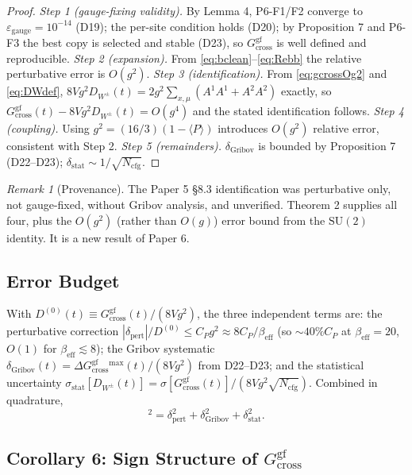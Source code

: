 \documentclass[11pt,a4paper]{article}
\theoremstyle{plain}
\theoremstyle{definition}
\theoremstyle{remark}
\newtheorem*{remark}{Remark}
\newcommand{\SU}{\mathrm{SU}}
\newcommand{\Gcrossgf}{G_{\mathrm{cross}}^{\mathrm{gf}}}
\newcommand{\DW}{D_{W^{\pm}}}
\newcommand{\be}{\beta_{\mathrm{eff}}}
\newcommand{\epsg}{\varepsilon_{\mathrm{gauge}}}
\newcommand{\Ncfg}{N_{\mathrm{cfg}}}
\begin{document}
\begin{proof}
\textit{Step 1 (gauge-fixing validity).} By Lemma 4, P6-F1/F2 converge to
$\epsg=10^{-14}$ (D19); the per-site condition holds (D20); by
Proposition 7 and P6-F3 the best copy is selected and stable (D23), so
$\Gcrossgf$ is well defined and reproducible.
\textit{Step 2 (expansion).} From \eqref{eq:bclean}--\eqref{eq:Rebb} the
relative perturbative error is $O(g^2)$.
\textit{Step 3 (identification).} From \eqref{eq:gcrossOg2} and
\eqref{eq:DWdef}, $8Vg^2\DW(t)=2g^2\sum_{x,\mu}(A^1A^1+A^2A^2)$ exactly,
so $\Gcrossgf(t)-8Vg^2\DW(t)=O(g^4)$ and the stated identification
follows.
\textit{Step 4 (coupling).} Using $g^2=(16/3)(1-\langle P\rangle)$ introduces
$O(g^2)$ relative error, consistent with Step 2.
\textit{Step 5 (remainders).} $\delta_{\mathrm{Gribov}}$ is bounded by
Proposition 7 (D22--D23); $\delta_{\mathrm{stat}}\sim1/\sqrt{\Ncfg}$.
\end{proof}

\begin{remark}[Provenance]
The Paper 5 \S8.3 identification was perturbative only, not gauge-fixed,
without Gribov analysis, and unverified. Theorem 2 supplies all four,
plus the $O(g^2)$ (rather than $O(g)$) error bound from the $\SU(2)$
identity. It is a new result of Paper 6.
\end{remark}

\subsection{Error Budget}
\label{ssec:errorbudget}

With $D^{(0)}(t)\equiv\Gcrossgf(t)/(8Vg^2)$, the three independent terms
are: the perturbative correction
$|\delta_{\mathrm{pert}}|/D^{(0)}\le C_P g^2\approx8C_P/\be$ (so $\sim40\%
C_P$ at $\be=20$, $O(1)$ for $\be\lesssim8$); the Gribov systematic
$\delta_{\mathrm{Gribov}}(t)=\Delta\Gcrossgf{}^{\max}(t)/(8Vg^2)$ from
D22--D23; and the statistical uncertainty
$\sigma_{\mathrm{stat}}[\DW(t)]=\sigma[\Gcrossgf(t)]/(8Vg^2\sqrt{\Ncfg})$.
Combined in quadrature,
\begin{equation}
  [\delta\DW(t)]^2=\delta_{\mathrm{pert}}^2+\delta_{\mathrm{Gribov}}^2
  +\delta_{\mathrm{stat}}^2.
  \label{eq:budget}
\end{equation}

\subsection{Corollary 6: Sign Structure of \texorpdfstring{$\Gcrossgf$}{Gcross}}
\label{ssec:cor6}
\end{document}

